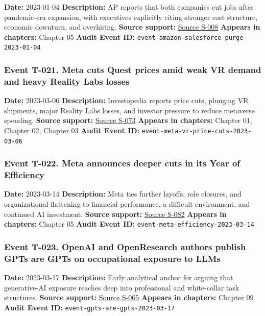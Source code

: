 \documentclass[
  american,
  11pt,
  letterpaper,
]{article}
\begin{document}
\textbf{Date:} 2023-01-04 \textbf{Description:} AP reports that both
companies cut jobs after pandemic-era expansion, with executives
explicitly citing stronger cost structure, economic downturn, and
overhiring. \textbf{Source support:}
\hyperref[source-s-008-amazon-salesforce-jettison-jobs-in-latest-tech-worker-purge]{Source
S-008} \textbf{Appears in chapters:} Chapter 05 \textbf{Audit Event ID:}
\texttt{event-amazon-salesforce-purge-2023-01-04}

\subsubsection{Event T-021. Meta cuts Quest prices amid weak VR demand
and heavy Reality Labs
losses}\label{event-t-021-meta-cuts-quest-prices-amid-weak-vr-demand-and-heavy-reality-labs-losses}

\textbf{Date:} 2023-03-06 \textbf{Description:} Investopedia reports
price cuts, plunging VR shipments, major Reality Labs losses, and
investor pressure to reduce metaverse spending. \textbf{Source support:}
\hyperref[source-s-073-meta-slashes-prices-for-vr-headsets]{Source
S-073} \textbf{Appears in chapters:} Chapter 01, Chapter 02, Chapter 03
\textbf{Audit Event ID:} \texttt{event-meta-vr-price-cuts-2023-03-06}

\subsubsection{Event T-022. Meta announces deeper cuts in its Year of
Efficiency}\label{event-t-022-meta-announces-deeper-cuts-in-its-year-of-efficiency}

\textbf{Date:} 2023-03-14 \textbf{Description:} Meta ties further
layoffs, role closures, and organizational flattening to financial
performance, a difficult environment, and continued AI investment.
\textbf{Source support:}
\hyperref[source-s-082-mark-zuckerberg-s-message-to-meta-employees]{Source
S-082} \textbf{Appears in chapters:} Chapter 05 \textbf{Audit Event ID:}
\texttt{event-meta-efficiency-2023-03-14}

\subsubsection{Event T-023. OpenAI and OpenResearch authors publish GPTs
are GPTs on occupational exposure to
LLMs}\label{event-t-023-openai-and-openresearch-authors-publish-gpts-are-gpts-on-occupational-exposure-to-llms}

\textbf{Date:} 2023-03-17 \textbf{Description:} Early analytical anchor
for arguing that generative-AI exposure reaches deep into professional
and white-collar task structures. \textbf{Source support:}
\hyperref[source-s-065-gpts-are-gpts-an-early-look-at-the-labor-market-impact-potential-of-large-language-models]{Source
S-065} \textbf{Appears in chapters:} Chapter 09 \textbf{Audit Event ID:}
\texttt{event-gpts-are-gpts-2023-03-17}
\end{document}
